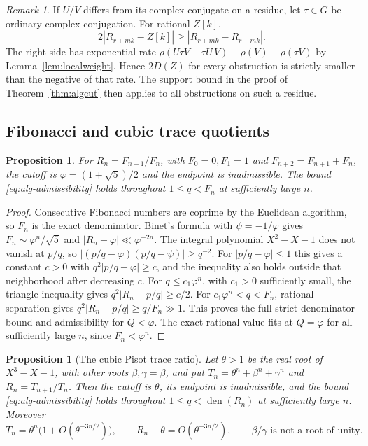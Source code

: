 \documentclass[11pt,a4paper,reqno]{amsart}
\newtheorem{proposition}[theorem]{Proposition}
\theoremstyle{definition}
\theoremstyle{remark}
\newtheorem{remark}[theorem]{Remark}
\numberwithin{equation}{section}
\begin{document}
\begin{remark}
If \(U/V\) differs from its complex conjugate on a residue, let
\(\tau\in G\) be ordinary complex conjugation. For rational \(Z[k]\),
\[
 2|R_{r+mk}-Z[k]|\ge |R_{r+mk}-\overline{R_{r+mk}}|.
\]
The right side has exponential rate
\(\rho(U\tau V-\tau U\,V)-\rho(V)-\rho(\tau V)\) by
Lemma~\ref{lem:localweight}. Hence \(2D(Z)\) for every obstruction
is strictly smaller than the negative of that rate. The support
bound in the proof of Theorem~\ref{thm:algcut} then applies to all
obstructions on such a residue.
\end{remark}

\subsection{Fibonacci and cubic trace quotients}

\begin{proposition}\label{prop:fib-scalar}
For \(R_n=F_{n+1}/F_n\), with \(F_0=0,F_1=1\) and
\(F_{n+2}=F_{n+1}+F_n\), the cutoff is
\(\varphi=(1+\sqrt5)/2\) and the endpoint is inadmissible.
The bound \eqref{eq:alg-admissibility} holds throughout
\(1\le q<F_n\) at sufficiently large \(n\).
\end{proposition}

\begin{proof}
Consecutive Fibonacci numbers are coprime by the Euclidean
algorithm, so \(F_n\) is the exact denominator. Binet's formula
with \(\psi=-1/\varphi\) gives \(F_n\sim\varphi^n/\sqrt5\) and
\(|R_n-\varphi|\ll\varphi^{-2n}\).
The integral polynomial \(X^2-X-1\) does not vanish at \(p/q\),
so \(|(p/q-\varphi)(p/q-\psi)|\ge q^{-2}\). For
\(|p/q-\varphi|\le1\) this gives a constant \(c>0\) with
\(q^2|p/q-\varphi|\ge c\), and the inequality also holds outside
that neighborhood after decreasing \(c\).
For \(q\le c_1\varphi^n\), with \(c_1>0\) sufficiently small,
the triangle inequality gives \(q^2|R_n-p/q|\ge c/2\).
For \(c_1\varphi^n<q<F_n\), rational separation gives
\(q^2|R_n-p/q|\ge q/F_n\gg1\). This proves the full
strict-denominator bound and admissibility for \(Q<\varphi\).
The exact rational value fits at \(Q=\varphi\) for all sufficiently
large \(n\), since \(F_n<\varphi^n\).
\end{proof}

\begin{proposition}[The cubic Pisot trace ratio]\label{prop:cubic-scalar}
Let \(\theta>1\) be the real root of \(X^3-X-1\), with other
roots \(\beta,\gamma=\overline\beta\), and put
\(T_n=\theta^n+\beta^n+\gamma^n\) and \(R_n=T_{n+1}/T_n\).
Then the cutoff is \(\theta\), its endpoint is inadmissible,
and the bound \eqref{eq:alg-admissibility} holds throughout
\(1\le q<\operatorname{den}(R_n)\) at sufficiently large \(n\).
Moreover
\[
 T_n=\theta^n\bigl(1+O(\theta^{-3n/2})\bigr),\qquad
 R_n-\theta=O(\theta^{-3n/2}),
 \qquad \beta/\gamma\text{ is not a root of unity}.
\]
\end{proposition}
\end{document}
